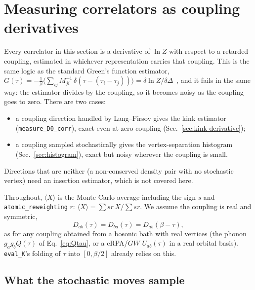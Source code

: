 \documentclass[a4paper,12pt]{article}
\newcommand{\aver}[1]{\ensuremath{\langle#1\rangle}}
\renewcommand{\t}{\ensuremath{\tau}}
\begin{document}
\section{Measuring correlators as coupling derivatives}
\label{sec:derivative}

Every correlator in this section is a derivative of $\ln Z$ with respect to a retarded
coupling, estimated in whichever representation carries that coupling. This is the same
logic as the standard Green's function estimator,
$G(\t)=-\tfrac1\beta\aver{\sum_{ij}M^{-1}_{ji}\,\delta(\t-(\t_i-\t_j))}
=\delta\ln Z/\delta\Delta$~\cite{GullRMP2011}, and it fails in the same way: the
estimator divides by the coupling, so it becomes noisy as the coupling goes to zero.
There are two cases:
\begin{itemize}
  \item a coupling direction handled by Lang--Firsov gives the kink estimator
    (\texttt{measure\_D0\_corr}), exact even at zero coupling
    (Sec.~\ref{sec:kink-derivative});
  \item a coupling sampled stochastically gives the vertex-separation histogram
    (Sec.~\ref{sec:histogram}), exact but noisy wherever the coupling is small.
\end{itemize}
Directions that are neither (a non-conserved density pair with no stochastic vertex)
need an insertion estimator, which is not covered here.

Throughout, $\aver{X}$ is the Monte Carlo average including the sign $s$ and
\texttt{atomic\_reweighting} $r$: $\aver{X}=\sum sr\,X/\sum sr$. We assume the coupling
is real and symmetric,
\begin{equation}
  D_{ab}(\t)=D_{ba}(\t)=D_{ab}(\beta-\t),
  \label{eq:dsym}
\end{equation}
as for any coupling obtained from a bosonic bath with real vertices (the phonon
$g_ag_bQ(\t)$ of Eq.~\eqref{eq:Qtau}, or a cRPA/$GW$ $U_{ab}(\t)$ in a real orbital
basis). \texttt{eval\_K}'s folding of $\t$ into $[0,\beta/2]$ already relies on this.

\subsection{What the stochastic moves sample}
\label{sec:sampled-weight}
\end{document}
